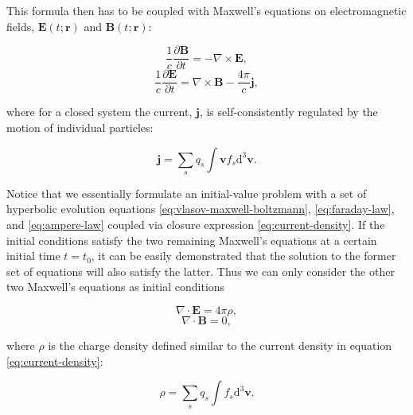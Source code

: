 This formula then has to be coupled with Maxwell's equations on electromagnetic fields, $\bm{E}(t;\bm{r})$ and $\bm{B}(t;\bm{r})$:

\begin{multicols}{2}
  \begin{equation}
    \label{eq:faraday-law}
    \frac{1}{c}\frac{\partial \bm{B}}{\partial t} = -\nabla \times\bm{E},
  \end{equation}
  \begin{equation}
    \label{eq:ampere-law}
    \frac{1}{c}\frac{\partial \bm{E}}{\partial t} = \nabla \times\bm{B} - \frac{4\pi}{c}\bm{j},
  \end{equation}
\end{multicols}
\noindent where for a closed system the current, $\bm{j}$, is self-consistently regulated by the motion of individual particles:

\begin{equation}
  \label{eq:current-density}
  \bm{j} = \sum_s q_s \int \bm{v} f_s \mathrm{d}^3\bm{v}.
\end{equation}

Notice that we essentially formulate an initial-value problem with a set of hyperbolic evolution equations \eqref{eq:vlasov-maxwell-boltzmann}, \eqref{eq:faraday-law}, and \eqref{eq:ampere-law} coupled via closure expression \eqref{eq:current-density}. If the initial conditions satisfy the two remaining Maxwell's equations at a certain initial time $t=t_0$, it can be easily demonstrated that the solution to the former set of equations will also satisfy the latter. Thus we can only consider the other two Maxwell's equations as initial conditions

\begin{multicols}{2}
  \begin{equation}
    \label{eq:poisson-law}
    \nabla\cdot \bm{E} = 4\pi \rho,
  \end{equation}
  \begin{equation}
    \label{eq:divb-law}
    \nabla\cdot \bm{B} = 0,
  \end{equation}
\end{multicols}
\noindent where $\rho$ is the charge density defined similar to the current density in equation \eqref{eq:current-density}:

\begin{equation}
  \label{eq:charge-density}
  \rho = \sum_s q_s \int f_s \mathrm{d}^3 \bm{v}.
\end{equation}

